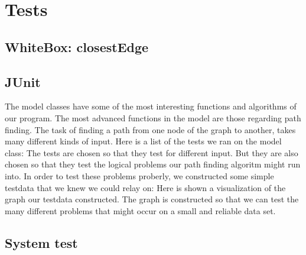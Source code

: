 \chapter{Tests}
\label{TEST}
\section{WhiteBox: closestEdge}
\label{TEST-CE}

\section{JUnit}
The model classes have some of the most interesting functions and algorithms of
our program. The most advanced functions in the model are those regarding path
finding. The task of finding a path from one node of the graph to another,
takes many different kinds of input. Here is a list of the tests we ran on the
model class:
The tests are chosen so that they test for different input. But they are also
chosen so that they test the logical problems our path finding algoritm might
run into. In order to test these problems proberly, we constructed some simple
testdata that we knew we could relay on:
Here is shown a
visualization of the graph our testdata constructed. The graph is constructed
so that we can test the many different problems that might occur on a small and
reliable data set.
\label{TEST-JU}

\section{System test}
\label{TEST-ST}
